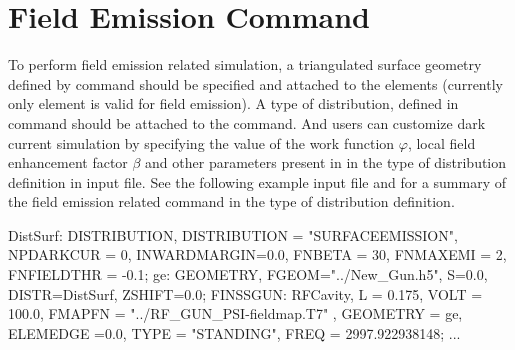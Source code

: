 \section{Field Emission Command}
\label{sec:FieldEmissionCmd}
To perform field emission related simulation, a triangulated surface geometry defined by  command  should be specified and attached to the elements (currently only  element is valid for field emission). A  type of distribution, defined in  command should be attached to the  command. And users can customize dark current simulation by specifying the value of the work
function $\varphi$, local field enhancement factor $\beta$ and other parameters
present in  in the  type of distribution definition in input file. See the following example input file and  for a summary of the field emission related command in the  type of distribution definition.\\
\begin{example}
DistSurf: DISTRIBUTION, DISTRIBUTION = "SURFACEEMISSION",
          NPDARKCUR = 0, INWARDMARGIN=0.0,
          FNBETA = 30, FNMAXEMI = 2,
          FNFIELDTHR = -0.1;
ge:       GEOMETRY, FGEOM="../New_Gun.h5",
          S=0.0, DISTR=DistSurf,
          ZSHIFT=0.0;
FINSSGUN: RFCavity, L = 0.175,
          VOLT = 100.0, FMAPFN = "../RF_GUN_PSI-fieldmap.T7" ,
          GEOMETRY = ge, ELEMEDGE =0.0,
          TYPE = "STANDING", FREQ = 2997.922938148;
...
\end{example}


